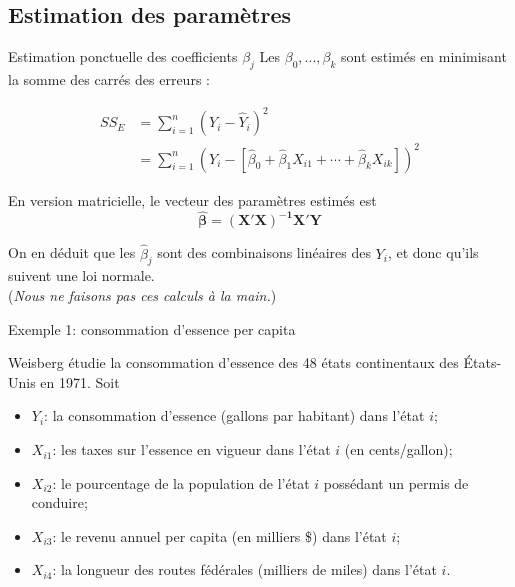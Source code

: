 \documentclass{BeamerTemplate}
\begin{document}
\subsection{Estimation des paramètres}

\begin{frame}[t]{Estimation ponctuelle des coefficients $\beta_j$}
Les  $\beta_0,..., \beta_k$ sont estimés en minimisant la somme des carrés des erreurs :

\alert{
$$\begin{array}{ll}
SS_E&=\sum\limits_{i=1}^n(Y_i-\hat Y_i)^2\\
&=\sum\limits_{i=1}^n(Y_i-[\hat{\beta}_0+\hat{\beta}_1X_{i1}+\cdots+\hat{\beta}_kX_{ik}])^2
\end{array}
 $$
 }

En version matricielle, le vecteur des paramètres estimés est
$$\boldsymbol{\hat\beta=(X'X)^{-1}X'Y}$$

On en déduit que les $\hat\beta_j$ sont des combinaisons linéaires des $Y_i$, et donc qu'ils suivent une loi normale.\\

({\it Nous ne faisons pas ces calculs à la main.})
\end{frame}

\begin{frame}[t]{Exemple 1: consommation d'essence per capita}


Weisberg étudie la consommation d'essence des 48 états continentaux
des États-Unis en 1971. Soit
\begin{itemize}
\item[] $Y_i$: la consommation d'essence (gallons par habitant) dans l'état $i$;
\item[] $X_{i1}$: les taxes sur l'essence en vigueur dans l'état $i$ (en cents/gallon);
\item[] $X_{i2}$: le pourcentage de la population de l'état $i$ possédant un permis
de conduire;
\item[] $X_{i3}$: le revenu annuel per capita (en milliers \$) dans l'état $i$;
\item[] $X_{i4}$: la longueur  des routes fédérales (milliers de miles) dans l'état $i$.
\end{itemize}

\end{frame}
\end{document}
